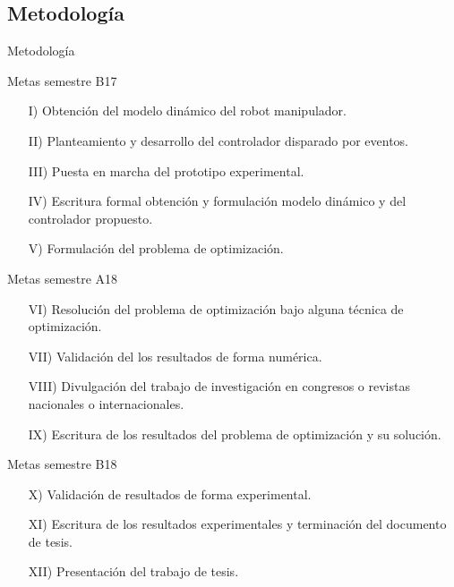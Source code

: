 \subsection{Metodología} 
\begin{frame}[shrink=20]{Metodología}
	\begin{block}{Metas semestre B17} 			
		\justifying		
		\begin{itemize}
			\item [I)] Obtención del modelo dinámico del robot manipulador.
			\item [II)] Planteamiento y desarrollo del controlador disparado por eventos.
			\item [III)] Puesta en marcha del prototipo experimental.
			\item [IV)] Escritura formal obtención y formulación modelo dinámico y del controlador propuesto.
			\item [V)] Formulación del problema de optimización.
		\end{itemize}
	\end{block}
		\begin{block}{Metas semestre A18} 			
		\justifying		
		\begin{itemize}
			\item [VI)] Resolución del problema de optimización bajo alguna técnica de optimización.
			\item [VII)] Validación del los resultados de forma numérica.
			\item [VIII)] Divulgación del trabajo de investigación en congresos o revistas nacionales o internacionales.  
			\item [IX)] Escritura de los resultados del problema de optimización y su solución.
		\end{itemize}
	\end{block}
		\begin{block}{Metas semestre B18} 			
		\justifying		
		\begin{itemize}
			\item [X)] Validación de resultados de forma experimental.
			\item [XI)] Escritura de los resultados experimentales y terminación del documento de tesis.
			\item [XII)] Presentación del trabajo de tesis.
		\end{itemize}
	\end{block}

\end{frame}